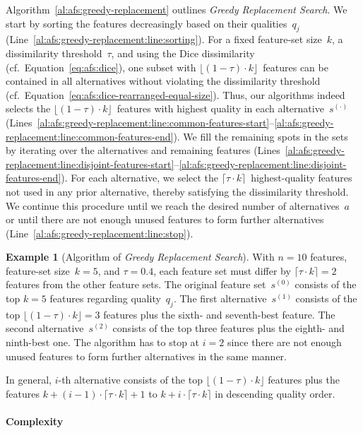 \documentclass{article}
\theoremstyle{definition}
\newtheorem{example}{Example}
\begin{document}
Algorithm~\ref{al:afs:greedy-replacement} outlines \emph{Greedy Replacement Search}.
We start by sorting the features decreasingly based on their qualities~$q_j$ (Line~\ref{al:afs:greedy-replacement:line:sorting}).
For a fixed feature-set size~$k$, a dissimilarity threshold~$\tau$, and using the Dice dissimilarity (cf.~Equation~\ref{eq:afs:dice}), one subset with $\lfloor (1 - \tau) \cdot k \rfloor$~features can be contained in all alternatives without violating the dissimilarity threshold (cf.~Equation~\ref{eq:afs:dice-rearranged-equal-size}).
Thus, our algorithms indeed selects the $\lfloor (1 - \tau) \cdot k \rfloor$~features with highest quality in each alternative~$s^{(\cdot)}$ (Lines~\ref{al:afs:greedy-replacement:line:common-features-start}--\ref{al:afs:greedy-replacement:line:common-features-end}).
We fill the remaining spots in the sets by iterating over the alternatives and remaining features (Lines~\ref{al:afs:greedy-replacement:line:disjoint-features-start}--\ref{al:afs:greedy-replacement:line:disjoint-features-end}).
For each alternative, we select the $\lceil \tau \cdot k \rceil$~highest-quality features not used in any prior alternative, thereby satisfying the dissimilarity threshold.
We continue this procedure until we reach the desired number of alternatives~$a$ or until there are not enough unused features to form further alternatives (Line~\ref{al:afs:greedy-replacement:line:stop}).
%
\begin{example}[Algorithm of \emph{Greedy Replacement Search}]
	With $n=10$ features, feature-set size~$k=5$, and $\tau=0.4$, each feature set must differ by $\lceil \tau \cdot k \rceil = 2$ features from the other feature sets.
	The original feature set~$s^{(0)}$ consists of the top $k=5$ features regarding quality~$q_j$.
	The first alternative~$s^{(1)}$ consists of the top $\lfloor (1 - \tau) \cdot k \rfloor = 3$ features plus the sixth- and seventh-best feature.
	The second alternative~$s^{(2)}$ consists of the top three features plus the eighth- and ninth-best one.
	The algorithm has to stop at $i=2$ since there are not enough unused features to form further alternatives in the same manner.
	\label{ex:afs:greedy-replacement:algorithm}
\end{example}
%
In general, $i$-th alternative consists of the top $\lfloor (1 - \tau) \cdot k \rfloor$ features plus the features $k + (i-1) \cdot \lceil \tau \cdot k \rceil + 1$ to $k + i \cdot \lceil \tau \cdot k \rceil$ in descending quality order.

\paragraph{Complexity}
\end{document}
